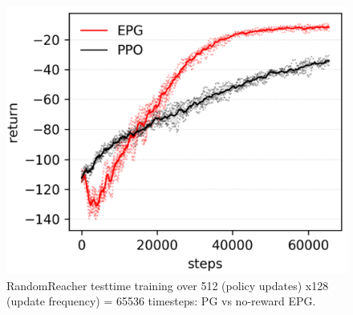 \begin{figure}[H]
	\includegraphics[scale=0.6]{reacher.png}
	\centering
	\caption{RandomReacher testtime training over 512 (policy updates) x128 (update frequency) = 65536 timesteps: PG vs no-reward EPG.}
	\label{reacher}
\end{figure}